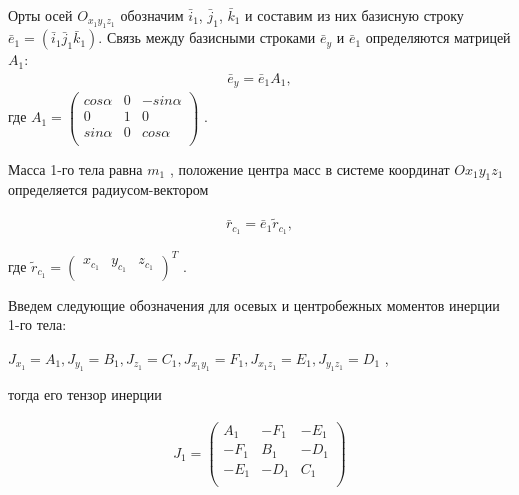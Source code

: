 \begin{enumerate}
	Орты осей $O_{x_1y_1z_1}$ обозначим $\bar{i}_1$, $\bar{j}_1$, $\bar{k}_1$ и составим из них базисную строку $\bar{e}_1 = (\bar{i}_1 \bar{j}_1 \bar{k}_1)$. Связь между базисными строками $\bar{e}_y$ и $\bar{e}_1$ определяются матрицей $A_1$:
	\begin{equation}
	\label{eq:p3:2}
	\begin{alignedat}{2}
	\bar{e}_y = \bar{e}_1	A_1 ,
	\end{alignedat}
	\end{equation}
	где  \( A_{1}= \left( \begin{matrix}
	cos \alpha   &  0  &  -sin \alpha \\
	0  &  1  &  0\\
	sin \alpha   &  0  &  cos \alpha \\
	\end{matrix}
	\right)  \) .\par
	
	Масса 1-го тела равна  \( m_{1} \) , положение центра масс в системе координат  \( Ox_{1}y_{1}z_{1} \)  определяется радиусом-вектором\par
	
	\begin{equation}
	\label{eq:p3:3}
	\begin{alignedat}{2}
	\bar{r}_{c_{1}}=\bar{e}_{1}\tilde{r}_{c_{1}},
	\end{alignedat}
	\end{equation}
	
	где  \( \tilde{r}_{c_{1}}= \left( \begin{matrix}
	x_{c_{1}}  &  y_{c_{1}}  &  z_{c_{1}}\\
	\end{matrix}
	\right) ^{T} \) .\par
	Введем следующие обозначения для осевых и центробежных моментов инерции 1-го тела:\par
	
	\( J_{x_{1}}=A_{1},J_{y_{1}}=B_{1},J_{z_{1}}=C_{1},J_{x_{1}y_{1}}=F_{1},J_{x_{1}z_{1}}=E_{1},J_{y_{1}z_{1}}=D_{1} \) ,\par
	
	тогда его тензор инерции\par
	
	\begin{equation}
	\label{eq:p3:4}
	\begin{alignedat}{2}
	J_{1}= \left( \begin{matrix}
	A_{1}  &  -F_{1}  &  -E_{1}\\
	-F_{1}  &  B_{1}  &  -D_{1}\\
	-E_{1}  &  -D_{1}  &  C_{1}\\
	\end{matrix}
	\right) 
	\end{alignedat}
	\end{equation}
		

\end{enumerate}
